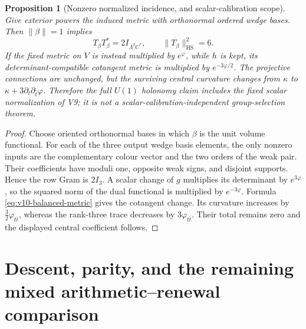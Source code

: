 \documentclass[11pt]{article}
\newtheorem{proposition}[proposition]{Proposition}
\theoremstyle{definition}
\theoremstyle{remark}
\newcommand{\HS}{\mathrm{HS}}
\begin{document}
\begin{proposition}[Nonzero normalized incidence, and scalar-calibration scope]
\label{prop:v10-incidence-norm}
Give exterior powers the induced metric with orthonormal ordered wedge
bases. Then $\|\beta\|=1$ implies
\begin{equation}
 \boxed{T_\beta T_\beta^*=2I_{\Lambda^2C^*},\qquad
        \|T_\beta\|_{\HS}^2=6.}
 \label{eq:v10-incidence-norm}
\end{equation}
If the fixed metric on $V$ is instead multiplied by $e^\varphi$, while
$h$ is kept, its determinant-compatible cotangent metric is multiplied by
$e^{-3\varphi/2}$. The projective connections are unchanged, but the
surviving central curvature changes from $\kappa$ to
$\kappa+3\partial_t\partial_{\bar t}\varphi$. Therefore the full
$U(1)$ holonomy claim includes the fixed scalar normalization of V9; it
is not a scalar-calibration-independent group-selection theorem.
\end{proposition}
\begin{proof}
Choose oriented orthonormal bases in which $\beta$ is the unit volume
functional. For each of the three output wedge basis elements, the only
nonzero inputs are the complementary colour vector and the two orders of
the weak pair. Their coefficients have moduli one, opposite weak signs,
and disjoint supports. Hence the row Gram is $2I_3$.
A scalar change of $g$ multiplies its determinant by $e^{3\varphi}$,
so the squared norm of the dual functional is multiplied by
$e^{-3\varphi}$. Formula \cref{eq:v10-balanced-metric} gives the
cotangent change. Its curvature increases by
$\tfrac32\varphi_{t\bar t}$, whereas the rank-three trace decreases
by $3\varphi_{t\bar t}$. Their total remains zero and the displayed
central coefficient follows.
\end{proof}

\section{Descent, parity, and the remaining mixed arithmetic--renewal comparison}
\label{sec:v10-scope}
\end{document}
